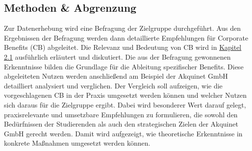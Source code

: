 \subsection{Methoden \& Abgrenzung}
Zur Datenerhebung wird eine Befragung der Zielgruppe durchgeführt. Aus den Ergebnissen der Befragung werden dann detaillierte Empfehlungen für Corporate Benefits (CB) abgeleitet. Die Relevanz und Bedeutung von CB wird in \hyperref[sec:relevanz]{Kapitel 2.1} ausführlich erläutert und diskutiert. Die aus der Befragung gewonnenen Erkenntnisse bilden die Grundlage für die Ableitung spezifischer Benefits. Diese abgeleiteten Nutzen werden anschließend am Beispiel der Akquinet GmbH detailliert analysiert und verglichen. Der Vergleich soll aufzeigen, wie die vorgeschlagenen CB in der Praxis umgesetzt werden können und welcher Nutzen sich daraus für die Zielgruppe ergibt. Dabei wird besonderer Wert darauf gelegt, praxisrelevante und umsetzbare Empfehlungen zu formulieren, die sowohl den Bedürfnissen der Studierenden als auch den strategischen Zielen der Akquinet GmbH gerecht werden. Damit wird aufgezeigt, wie theoretische Erkenntnisse in konkrete Maßnahmen umgesetzt werden können.
